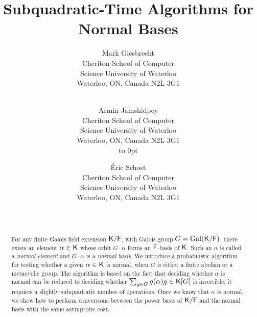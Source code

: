 \contact{}%
\submitted{}%
\title{Subquadratic-Time Algorithms for Normal Bases}%
\titlehead{Normal Bases}%
\author{
Mark Giesbrecht \\
Cheriton School of Computer\\ Science
University of Waterloo\\ 
Waterloo, ON, Canada  N2L 3G1 \\
\\
\and 
Armin Jamshidpey\\
Cheriton School of Computer\\ Science
University of Waterloo\\ 
Waterloo, ON, Canada  N2L 3G1 \\
\hbox to 0pt{}
\and 
\'Eric Schost \\
Cheriton School of Computer\\ Science
University of Waterloo\\ 
Waterloo, ON, Canada  N2L 3G1 \\
\\
\\
}
\begin{abstract}
  For any finite Galois field extension ${\mathsf{K}}/{\mathsf{F}}$, with Galois group $G
  = \mathrm{Gal}({\mathsf{K}}/{\mathsf{F}})$, there exists an element $\alpha \in {\mathsf{K}}$
  whose orbit $G\cdot\alpha$ forms an ${\mathsf{F}}$-basis of ${\mathsf{K}}$. Such an
  $\alpha$ is called a \emph{normal element} and $G\cdot\alpha$ is a
  \emph{normal basis}. We introduce a probabilistic algorithm for
  testing whether a given $\alpha \in {\mathsf{K}}$ is normal, when $G$ is
  either a finite abelian or a metacyclic group.  The algorithm is
  based on the fact that deciding whether $\alpha$ is normal can be
  reduced to deciding whether $\sum_{g \in G} g(\alpha)g \in {\mathsf{K}}[G]$ is
  invertible; it requires a slightly subquadratic number of
  operations. Once we know that $\alpha$ is normal, we show how to
  perform conversions between the power basis of ${\mathsf{K}}/{\mathsf{F}}$ and the
  normal basis with the same asymptotic cost.
\end{abstract}


